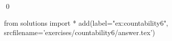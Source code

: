 
\begin{ex} 
  \label{ex:countability6}
  
  \qed
\end{ex} 
\begin{python0}
from solutions import *
add(label="ex:countability6",
    srcfilename='exercises/countability6/answer.tex') 
\end{python0}
